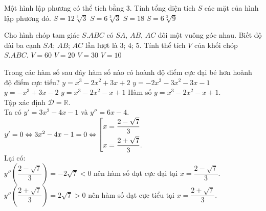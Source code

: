 \begin{ex}%
 Một hình lập phương có thể tích bằng $3$. Tính tổng diện tích $S$ các mặt của hình lập phương đó.
 \choice
  {$S = 12\sqrt[3]{3}$}
  {$S = 6\sqrt[3]{3}$}
  {$S = 18$}
  {\True $S = 6\sqrt[3]{9}$}
\end{ex}


\begin{ex}%
 Cho hình chóp tam giác $S.ABC$ có $SA$, $AB$, $AC$ đôi một vuông góc nhau. Biết độ dài ba cạnh $SA$; $AB$; $AC$ lần lượt là $3$; $4$; $5$. Tính thể tích $V$ của khối chóp $S.ABC$.
 \choice
  {$V = 60$}
  {$V = 20$}
  {$V = 30$}
  {\True $V = 10$}
\end{ex}


\begin{ex}%
 Trong các hàm số sau đây hàm số nào có hoành độ điểm cực đại bé hơn hoành độ điểm cực tiểu?
 \choice
  {$y = x^3-2x^2+3x+2$}
  {$y = -2x^3-3x^2-3x-1$}
  {$y = -x^3+3x-2$}
  {\True $y = x^3-2x^2-x+1$}
 \loigiai
  {
  Hàm số $y = x^3 - 2x^2 - x +1$.\\
  Tập xác định $\mathscr{D} = \mathbb{R}$.\\
  Ta có $y' = 3x^2 - 4x - 1$ và $y'' = 6x - 4$.\\
  $y' = 0 \Leftrightarrow 3x^2 - 4x - 1 = 0 \Leftrightarrow \left[\begin{aligned}& x = \dfrac{2-\sqrt{7}}{3} \\& x = \dfrac{2+\sqrt{7}}{3}.\end{aligned}\right.$\\
  Lại có:\\
  $y'' \left(\dfrac{2-\sqrt{7}}{3}\right) = -2\sqrt{7} < 0$ nên hàm số đạt cực đại tại $x = \dfrac{2-\sqrt{7}}{3}$.\\
  $y'' \left(\dfrac{2+\sqrt{7}}{3}\right) = 2\sqrt{7} > 0$ nên hàm số đạt cực tiểu tại $x = \dfrac{2+\sqrt{7}}{3}$.
  }
\end{ex}


